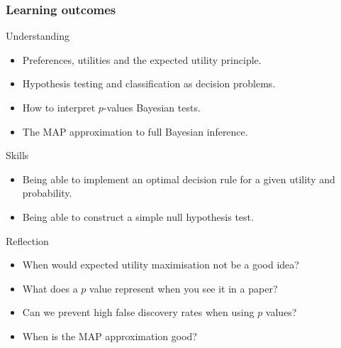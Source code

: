 \begin{frame}
  \frametitle{Learning outcomes}
  \begin{block}{Understanding}
    \begin{itemize}
    \item Preferences, utilities and the expected utility principle.
    \item Hypothesis testing and classification as decision problems.
    \item How to interpret $p$-values Bayesian tests.
    \item The MAP approximation to full Bayesian inference.
    \end{itemize}
  \end{block}
  
  \begin{block}{Skills}
    \begin{itemize}
    \item Being able to implement an optimal decision rule for a given utility and probability.
    \item Being able to construct a simple null hypothesis test.
    \end{itemize}
  \end{block}

  \begin{block}{Reflection}
    \begin{itemize}
    \item When would expected utility maximisation not be a good idea?
    \item What does a $p$ value represent when you see it in a paper?
    \item Can we prevent high false discovery rates when using $p$ values?
    \item When is the MAP approximation good?
    \end{itemize}
  \end{block}
  
\end{frame}




